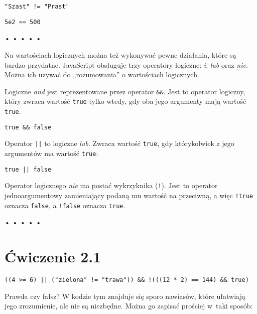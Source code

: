 \begin{verbatim} 
"Szast" != "Prast"
\end{verbatim}

\begin{verbatim} 
5e2 == 500
\end{verbatim}
  
\begin{center}
• • • • •
\end{center}
  
    
Na wartościach logicznych można też wykonywać pewne działania, które są bardzo przydatne. JavaScript obsługuje trzy operatory logiczne: \emph{i}, \emph{lub} oraz \emph{nie}. Można ich używać do „rozumowania” o wartościach logicznych.

    
Logiczne \emph{and} jest reprezentowane przez operator \texttt{\&\&}\index{\&\&}. Jest to operator logiczny, który zwraca wartość \texttt{true} tylko wtedy, gdy oba jego argumenty mają wartość \texttt{true}.

\begin{verbatim} 
true && false
\end{verbatim}
    
Operator \texttt{||}\index{||} to logiczne \emph{lub}. Zwraca wartość \texttt{true}, gdy którykolwiek z jego argumentów ma wartość \texttt{true}:

\begin{verbatim} 
true || false
\end{verbatim}
    
Operator logicznego \emph{nie} ma postać wykrzyknika (\texttt{!}\index{!}). Jest to operator jednoargumentowy zamieniający podaną mu wartość na przeciwną, a więc \texttt{!true} oznacza \texttt{false}, a \texttt{!false} oznacza \texttt{true}.

  
\begin{center}
• • • • •
\end{center}
  
\section*{Ćwiczenie 2.1}
\label{sec:2.1}
    
\begin{verbatim} 
((4 >= 6) || ("zielona" != "trawa")) && !(((12 * 2) == 144) && true)
\end{verbatim}
      
Prawda czy fałsz? W kodzie tym znajduje się sporo nawiasów, które ułatwiają jego zrozumienie, ale nie są niezbędne. Można go zapisać prościej w~taki sposób:

